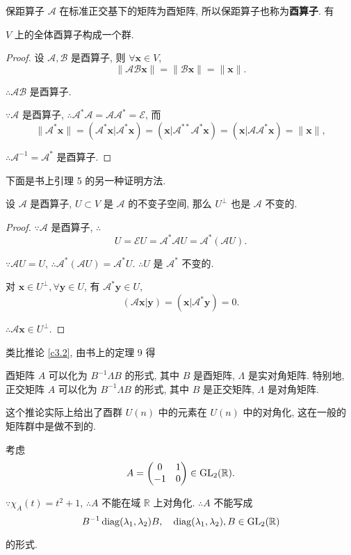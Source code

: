 \documentclass{ctexart}
\begin{document}
保距算子 $\mathcal{A}$ 在标准正交基下的矩阵为酉矩阵, 所以保距算子也称为\textbf{酉算子}. 有
\begin{theorem}
    $V$ 上的全体酉算子构成一个群.
\end{theorem}
\begin{proof}
    设 $\mathcal{A},\mathcal{B}$ 是酉算子, 则 $\forall\boldsymbol{x}\in V$,
    \[\|\mathcal{AB}\boldsymbol{x}\|=\|\mathcal{B}\boldsymbol{x}\|=\|\boldsymbol{x}\|.\]

    $\therefore\mathcal{AB}$ 是酉算子.

    $\because\mathcal{A}$ 是酉算子, $\therefore\mathcal{A}^*\mathcal{A}=\mathcal{A}\mathcal{A}^*=\mathcal{E}$, 而
    \[\|\mathcal{A}^*\boldsymbol{x}\|=(\mathcal{A}^*\boldsymbol{x}|\mathcal{A}^*\boldsymbol{x})=(\boldsymbol{x}|\mathcal{A}^{**}\mathcal{A}^*\boldsymbol{x})=(\boldsymbol{x}|\mathcal{A}\mathcal{A}^*\boldsymbol{x})=\|\boldsymbol{x}\|,\]
    
    $\therefore\mathcal{A}^{-1}=\mathcal{A}^*$ 是酉算子.
\end{proof}
下面是书上引理 5 的另一种证明方法.
\begin{lemma}[书上的引理 5]\label{l3.1}
    设 $\mathcal{A}$ 是酉算子, $U\subset V$ 是 $\mathcal{A}$ 的不变子空间, 那么 $U^\perp$ 也是 $\mathcal{A}$ 不变的.
\end{lemma}
\begin{proof}
    $\because\mathcal{A}$ 是酉算子, $\therefore$
    \[U=\mathcal{E}U=\mathcal{A}^*\mathcal{A}U=\mathcal{A}^*(\mathcal{A}U).\]

    $\because\mathcal{A}U=U$, $\therefore\mathcal{A}^*(\mathcal{A}U)=\mathcal{A}^*U$. $\therefore U$ 是 $\mathcal{A}^*$ 不变的.

    对 $\boldsymbol{x}\in U^\perp,\forall\boldsymbol{y}\in U$, 有 $\mathcal{A}^*\boldsymbol{y}\in U$,
    \[(\mathcal{A}\boldsymbol{x}|\boldsymbol{y})=(\boldsymbol{x}|\mathcal{A}^*\boldsymbol{y})=0.\]

    $\therefore\mathcal{A}\boldsymbol{x}\in U^\perp$.
\end{proof}
类比推论 \ref{c3.2}, 由书上的定理 9 得
\begin{corollary}\label{c3.3}
    酉矩阵 $A$ 可以化为 $B^{-1}\Lambda B$ 的形式, 其中 $B$ 是酉矩阵, $\Lambda$ 是实对角矩阵. 特别地, 正交矩阵 $A$ 可以化为 $B^{-1}\Lambda B$ 的形式, 其中 $B$ 是正交矩阵, $\Lambda$ 是对角矩阵.
\end{corollary}
这个推论实际上给出了酉群 $U(n)$ 中的元素在 $U(n)$ 中的对角化, 这在一般的矩阵群中是做不到的.
\begin{example}
    考虑
    \[A=\begin{pmatrix}
        0 & 1 \\
        -1 & 0 \\
    \end{pmatrix}\in\operatorname{GL} _2(\mathbb{R}).\]
    
    $\because\chi_A(t)=t^2+1$, $\therefore A$ 不能在域 $\mathbb{R}$ 上对角化. $\therefore A$ 不能写成
    \[B^{-1}\operatorname{diag} (\lambda_1,\lambda_2)B,\quad \operatorname{diag} (\lambda_1,\lambda_2),B\in\operatorname{GL} _2(\mathbb{R})\]

    的形式.
\end{example}
\end{document}
